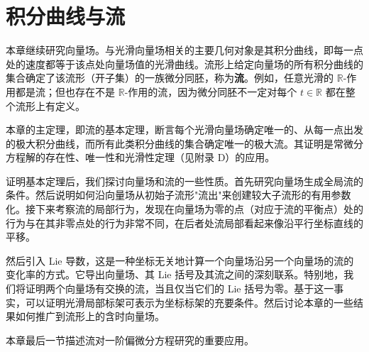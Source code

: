 \documentclass[../main.tex]{subfiles}
\begin{document}
\chapter{积分曲线与流}\label{chapter:ch09-积分曲线与流}

本章继续研究向量场。与光滑向量场相关的主要几何对象是其积分曲线，即每一点处的速度都等于该点处向量场值的光滑曲线。流形上给定向量场的所有积分曲线的集合确定了该流形（开子集）的一族微分同胚，称为\textbf{流}。例如，任意光滑的 $\mathbb{R}$-作用都是流；但也存在不是 $\mathbb{R}$-作用的流，因为微分同胚不一定对每个 $t\in\mathbb{R}$ 都在整个流形上有定义。

本章的主定理，即流的基本定理，断言每个光滑向量场确定唯一的、从每一点出发的极大积分曲线，而所有此类积分曲线的集合确定唯一的极大流。其证明是常微分方程解的存在性、唯一性和光滑性定理（见附录 D）的应用。

证明基本定理后，我们探讨向量场和流的一些性质。首先研究向量场生成全局流的条件。然后说明如何沿向量场从初始子流形"流出"来创建较大子流形的有用参数化。接下来考察流的局部行为，发现在向量场为零的点（对应于流的平衡点）处的行为与在其非零点处的行为非常不同，在后者处流局部看起来像沿平行坐标直线的平移。

然后引入 Lie 导数，这是一种坐标无关地计算一个向量场沿另一个向量场的流的变化率的方式。它导出向量场、其 Lie 括号及其流之间的深刻联系。特别地，我们将证明两个向量场有交换的流，当且仅当它们的 Lie 括号为零。基于这一事实，可以证明光滑局部标架可表示为坐标标架的充要条件。然后讨论本章的一些结果如何推广到流形上的含时向量场。

本章最后一节描述流对一阶偏微分方程研究的重要应用。










\end{document}
